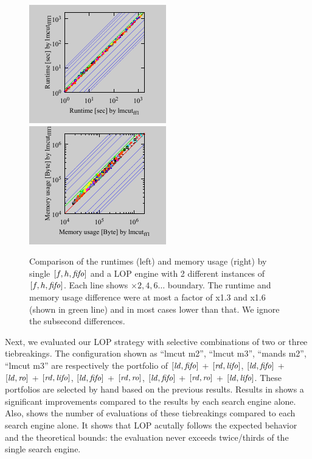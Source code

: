 \begin{figure}[tb]
 \centering {}
 \includegraphics{tables/aaai16-30min/aaai16prelim3/time-nokey-lmcut_ff-lmcut_ffff.pdf}
 \includegraphics{tables/aaai16-30min/aaai16prelim3/mem-nokey-lmcut_ff-lmcut_ffff.pdf}
 \caption{Comparison of the runtimes (left) and memory usage (right) by
 single $[f,h,\mbox{\textit{fifo}}]$ and a LOP engine with 2 different instances of
 $[f,h,\mbox{\textit{fifo}}]$. Each line shows $\times 2,4,6\ldots$ boundary.
 The runtime and memory usage difference were at most a factor of x1.3
 and x1.6 (shown in green line) and in most cases lower than that. We
 ignore the subsecond differences.}  \label{ffff}
\end{figure}

Next, we evaluated our LOP
strategy with selective combinations of two or three tiebreakings.
The configuration shown as ``lmcut m2'', ``lmcut m3'', ``mands m2'',
``lmcut m3'' are respectively the portfolio of
$[\mbox{\textit{ld}},\mbox{\textit{fifo}}]$ + $[\mbox{\textit{rd}},\mbox{\textit{lifo}}]$, $[\mbox{\textit{ld}},\mbox{\textit{fifo}}]$ + $[\mbox{\textit{ld}},\mbox{\textit{ro}}]$ + $[\mbox{\textit{rd}},\mbox{\textit{lifo}}]$,
$[\mbox{\textit{ld}},\mbox{\textit{fifo}}]$ + $[\mbox{\textit{rd}},\mbox{\textit{ro}}]$, $[\mbox{\textit{ld}},\mbox{\textit{fifo}}]$ + $[\mbox{\textit{rd}},\mbox{\textit{ro}}]$ + $[\mbox{\textit{ld}},\mbox{\textit{lifo}}]$. These
portfolios are selected by hand based on the previous results.
Results in 
shows a significant improvements compared to the results by each search
engine alone.
% 
Also,  shows the number of evaluations of these
tiebreakings compared to each search engine alone.  It shows that
LOP acutally follows the expected behavior and the theoretical
bounds: the evaluation never exceeds twice/thirds of the single
search engine.

